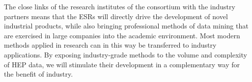 The close links of the research institutes of the consortium with the industry partners means that the ESRs will directly drive the development of novel industrial products, while also bringing professional methods of data mining that are exercised in large companies into the academic environment. 
Most modern methods applied in research can in this way be transferred to industry applications. 
By exposing industry-grade methods to the volume and complexity of HEP data, we will stimulate their development in a complementary way for the benefit of industry.


